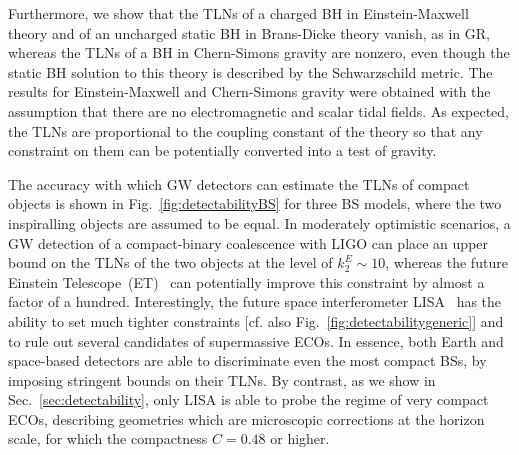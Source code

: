 \documentclass[aps,twocolumn,showpacs,preprintnumbers,nofootinbib,prd,superscriptaddress,groupedaddress,10pt]{revtex4-1}
\begin{document}
Furthermore, we show that the TLNs of a charged BH in Einstein-Maxwell theory and of an uncharged static BH in Brans-Dicke theory vanish, as in GR, whereas the TLNs of a BH in Chern-Simons gravity are nonzero, even though the static BH solution to this theory is described by the Schwarzschild metric. The results for Einstein-Maxwell and Chern-Simons gravity were obtained with the assumption that there are no electromagnetic and scalar tidal fields. As expected, the TLNs are proportional to the coupling constant of the theory so that any constraint on them can be potentially converted into a test of gravity.


The accuracy with which GW detectors can estimate the TLNs of compact objects is shown in Fig.~\ref{fig:detectabilityBS} for three BS models, where the two inspiralling objects are assumed to be equal. 
In moderately optimistic scenarios, a GW detection of a compact-binary coalescence with LIGO can place an upper bound on the TLNs of the two objects at the level of $k_2^{E}\sim 10$, whereas the future Einstein Telescope~(ET)~\cite{Punturo:2010zz} can potentially improve this constraint by almost a factor of a hundred. Interestingly, the future space interferometer LISA~\cite{AmaroSeoane:2012je} has the ability to set much tighter constraints [cf. also Fig.~\ref{fig:detectabilitygeneric}] and to rule out several candidates of supermassive ECOs.
In essence, both Earth and space-based detectors are able to discriminate even the most
compact BSs, by imposing stringent bounds on their TLNs. By contrast, as we show in Sec.~\ref{sec:detectability}, only LISA is able to probe the regime of very compact ECOs, describing geometries which are microscopic corrections at the horizon scale, for which the compactness $C=0.48$ or higher.


\end{document}
